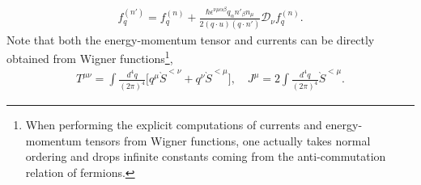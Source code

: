 \documentclass[aps,prd,showkeys,preprint,amsmath,amssymb,nofootinbib]{revtex4-1}
\newcommand{\blue}[1]{{\color{blue} #1} }
\begin{document}
\begin{eqnarray}
f^{(n')}_q= f^{(n)}_q+\frac{\hbar\epsilon^{\nu\mu\alpha\beta}q_{\alpha}n'_{\beta}n_{\mu}}{2(q\cdot u)(q\cdot n')}\mathcal{D}_{\nu}f^{(n)}_q.
\label{f_n_1}
\end{eqnarray}
Note that both the energy-momentum tensor and currents can be directly obtained from Wigner functions\textcolor{blue}{\footnote{When performing the explicit computations of currents and energy-momentum tensors from Wigner functions, one actually takes normal ordering and drops infinite constants coming from the anti-commutation relation of fermions.}},
\begin{eqnarray}\label{def_J}
T^{\mu\nu}=\int \frac{d^4q}{(2\pi)^4}\big[q^{\mu}\grave{S}^{<\nu}+q^{\nu}\grave{S}^{<\mu}\big],
\quad J^{\mu}=2\int \frac{d^4q}{(2\pi)^4}\grave{S}^{<\mu}.
\end{eqnarray}




 
\end{document}
